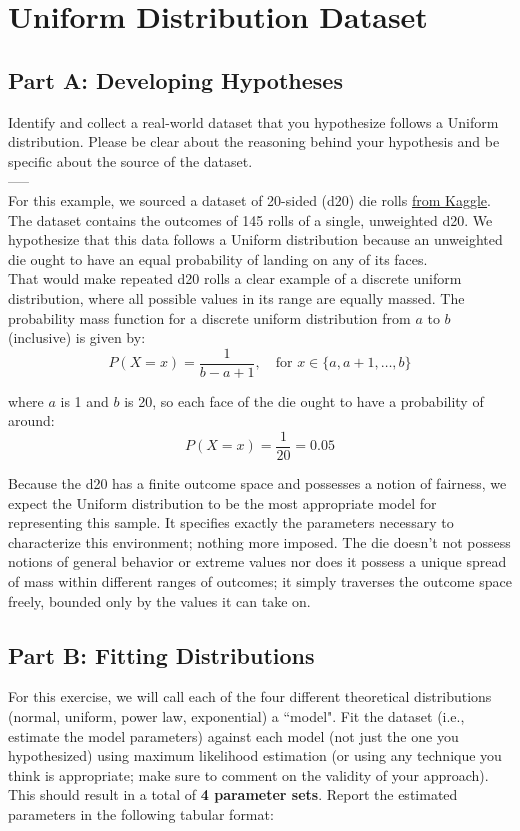 \section{Uniform Distribution Dataset}

\subsection{Part A: Developing Hypotheses}
Identify and collect a real-world dataset that you hypothesize follows a Uniform distribution. Please be clear about the reasoning behind your hypothesis and be specific about the source of the dataset.\\
-----\\
For this example, we sourced a dataset of 20-sided (d20) die rolls \hyperlink{https://www.kaggle.com/datasets/devocorum/d20-rolls}{from Kaggle}. The dataset contains the outcomes of 145 rolls of a single, unweighted d20. We hypothesize that this data follows a Uniform distribution because an unweighted die ought to have an equal probability of landing on any of its faces.\\

That would make repeated d20 rolls a clear example of a discrete uniform distribution, where all possible values in its range are equally massed. The probability mass function for a discrete uniform distribution from \( a \) to \( b \) (inclusive) is given by:\\

$$
P(X = x) = \frac{1}{b - a + 1}, \quad \text{for } x \in \{a, a+1, \ldots, b\}
$$

where $ a $ is 1 and $ b $ is 20, so each face of the die ought to have a probability of around:\\
\[
P(X = x) = \frac{1}{20} = 0.05
\]

Because the d20 has a finite outcome space and possesses a notion of fairness, we expect the Uniform distribution to be the most appropriate model for representing this sample. It specifies exactly the parameters necessary to characterize this environment; nothing more imposed. The die doesn't not possess notions of general behavior or extreme values nor does it possess a unique spread of mass within different ranges of outcomes; it simply traverses the outcome space freely, bounded only by the values it can take on.\\
\newpage

\subsection{Part B: Fitting Distributions}
For this exercise, we will call each of the four different theoretical distributions (normal, uniform, power law, exponential) a ``model". Fit the dataset (i.e., estimate the model parameters) against each model (not just the one you hypothesized) using maximum likelihood estimation (or using any technique you think is appropriate; make sure to comment on the validity of your approach). This should result in a total of \textbf{4 parameter sets}. Report the estimated parameters in the following tabular format:

